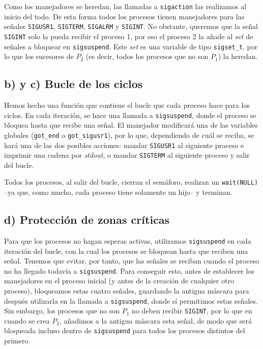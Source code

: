 \documentclass{article}
\begin{document}
Como los manejadores se heredan, las llamadas a \texttt{sigaction} las realizamos al inicio del todo. De esta forma todos los procesos tienen manejadores para las señales \texttt{SIGUSR1}, \texttt{SIGTERM}, \texttt{SIGALRM} y \texttt{SIGINT}. No obstante, queremos que la señal \texttt{SIGINT} solo la pueda recibir el proceso 1, por eso el proceso 2 la añade al \textit{set} de señales a bloquear en \texttt{sigsuspend}. Este \textit{set} es una variable de tipo \texttt{sigset\_t}, por lo que los sucesores de $P_2$ (es decir, todos los procesos que no son $P_1$) la heredan. 



\subsection*{b) y c) Bucle de los ciclos}

Hemos hecho una función que contiene el bucle que cada proceso hace para los ciclos. En cada iteración, se hace una llamada a \texttt{sigsuspend}, donde el proceso se bloquea hasta que recibe una señal. El manejador modificará una de las variables globales (\texttt{got\_end} o \texttt{got\_sigusr1}), por lo que, dependiendo de cuál se reciba, se hará una de las dos posibles acciones: mandar \texttt{SIGUSR1} al siguiente proceso e imprimir una cadena por \textit{stdout}, o mandar \texttt{SIGTERM} al siguiente proceso y salir del bucle.

Todos los procesos, al salir del bucle, cierran el semáforo, realizan un \texttt{wait(NULL)} --ya que, como mucho, cada proceso tiene solamente un hijo-- y terminan.

\subsection*{d) Protección de zonas críticas} 

Para que los procesos no hagan esperas activas, utilizamos \texttt{sigsuspend} en cada iteración del bucle, con la cual los procesos se bloquean hasta que reciben una señal. Tenemos que evitar, por tanto, que las señales se reciban cuando el proceso no ha llegado todavía a \texttt{sigsuspend}. Para conseguir esto, antes de establecer los manejadores en el proceso inicial (y antes de la creación de cualquier otro proceso), bloqueamos estas cuatro señales, guardando la antigua máscara para después utilizarla en la llamada a \texttt{sigsuspend}, donde sí permitimos estas señales. Sin embargo, los procesos que no son $P_1$ no deben recibir \texttt{SIGINT}, por lo que en cuando se crea $P_2$, añadimos a la antigua máscara esta señal, de modo que será bloqueada incluso dentro de \texttt{sigsuspend} para todos los procesos distintos del primero.
\end{document}
